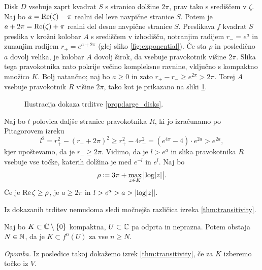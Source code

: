 \begin{dokaz}
    Disk \(D\) vsebuje zaprt kvadrat \(S\) s stranico dolžine \(2 \pi\), prav tako s središčem v \(\zeta\). Naj bo \(a = \operatorname{Re} (\zeta) - \pi\) realni del leve navpične stranice \(S\). Potem je \(a + 2 \pi = \operatorname{Re} (\zeta) + \pi\) realni del desne navpične stranice \(S\). Preslikava \(f\) kvadrat \(S\) preslika v krožni kolobar \(A\) s središčem v izhodišču, notranjim radijem \(r_{-} = e^a\) in zunanjim radijem \(r_{+} = e^{a + 2 \pi}\) (glej sliko \ref{fig:exponential}). Če sta \(\rho\) in posledično \(a\) dovolj velika, je kolobar \(A\) dovolj širok, da vsebuje pravokotnik višine \(2 \pi\). Slika tega pravokotnika nato pokrije večino kompleksne ravnine, vključno s kompaktno množico \(K\). Bolj natančno; naj bo \(a \geq 0\) in zato \(r_+ - r_- \geq e^{2 \pi} > 2 \pi\). Torej \(A\) vsebuje pravokotnik \(R\) višine \(2 \pi\), tako kot je prikazano na sliki \ref{fig:transitivity}.

    \begin{figure}[hb]
        \centering
        
        \caption{Ilustracija dokaza trditve \ref{prop:large_disks}.}
        \label{fig:transitivity}
    \end{figure}

    \noindent Naj bo \(l\) polovica daljše stranice pravokotnika \(R\), ki jo izračunamo po Pitagorovem izreku
    \[l^2 = r_+^2 - (r_- + 2 \pi)^2 \geq r_+^2 - 4 r_-^2 = (e^{4 \pi} - 4) \cdot e^{2 a} > e^{2 a},\]
    kjer upoštevamo, da je \(r_- \geq 2 \pi\). Vidimo, da je \(l > e^a\) in slika pravokotnika \(R\) vsebuje vse točke, katerih dolžina je med \(e^{- l}\) in \(e^l\). Naj bo
    \[\rho \coloneq 3 \pi + \max_{z \in K} \, \bigl| \log \abs{z} \bigr|.\]
    Če je \(\operatorname{Re} \zeta \geq \rho\), je \(a \geq 2 \pi\) in \(l > e^a > a > \abs{\log \abs{z}}\).
\end{dokaz}

\noindent Iz dokazanih trditev nemudoma sledi močnejša različica izreka \ref{thm:transitivity}.

\begin{posledica}
    Naj bo \(K \subset \mathbb C \setminus \left\{ 0 \right\}\) kompaktna, \(U \subset \mathbb C\) pa odprta in neprazna. Potem obstaja \(N \in \mathbb N\), da je \(K \subset f^n (U)\) za vse \(n \geq N\).
\end{posledica}

\noindent \textit{Opomba.} Iz posledice takoj dokažemo izrek \ref{thm:transitivity}, če za \(K\) izberemo točko iz \(V\).

